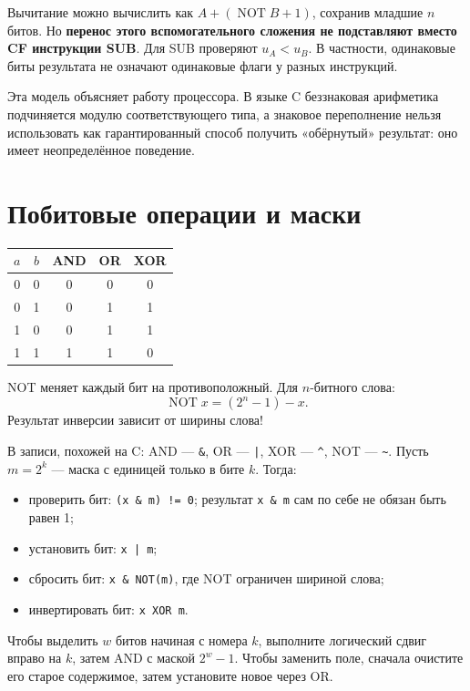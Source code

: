 Вычитание можно вычислить как $A+(\mathop{\mathrm{NOT}}B+1)$, сохранив младшие $n$ битов. Но \textbf{перенос этого вспомогательного сложения не подставляют вместо CF инструкции SUB}. Для SUB проверяют $u_A<u_B$. В частности, одинаковые биты результата не означают одинаковые флаги у разных инструкций.

Эта модель объясняет работу процессора. В языке C беззнаковая арифметика подчиняется модулю соответствующего типа, а знаковое переполнение нельзя использовать как гарантированный способ получить «обёрнутый» результат: оно имеет неопределённое поведение.

\section{Побитовые операции и маски}
\begin{center}
\begin{tabular}{cc|ccc}
$a$ & $b$ & AND & OR & XOR\\\hline
0 & 0 & 0 & 0 & 0\\
0 & 1 & 0 & 1 & 1\\
1 & 0 & 0 & 1 & 1\\
1 & 1 & 1 & 1 & 0
\end{tabular}
\end{center}
NOT меняет каждый бит на противоположный. Для $n$-битного слова:
\[
\mathop{\mathrm{NOT}}x=(2^n-1)-x.
\]
Результат инверсии зависит от ширины слова!

В записи, похожей на C: AND --- \texttt{\&}, OR --- \texttt{|}, XOR --- \texttt{\^{}}, NOT --- \texttt{\textasciitilde}. Пусть $m=2^k$ --- маска с единицей только в бите $k$. Тогда:
\begin{itemize}
    \item проверить бит: \texttt{(x \& m) != 0}; результат \texttt{x \& m} сам по себе не обязан быть равен 1;
    \item установить бит: \texttt{x | m};
    \item сбросить бит: \texttt{x \& NOT(m)}, где NOT ограничен шириной слова;
    \item инвертировать бит: \texttt{x XOR m}.
\end{itemize}
Чтобы выделить $w$ битов начиная с номера $k$, выполните логический сдвиг вправо на $k$, затем AND с маской $2^w-1$. Чтобы заменить поле, сначала очистите его старое содержимое, затем установите новое через OR.

